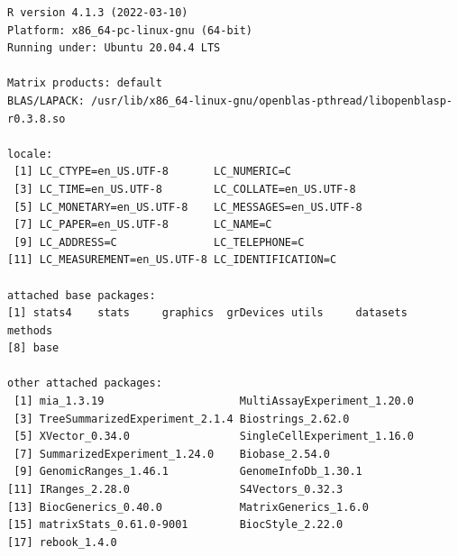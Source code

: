 \documentclass[
]{book}
\begin{document}
\begin{verbatim}
R version 4.1.3 (2022-03-10)
Platform: x86_64-pc-linux-gnu (64-bit)
Running under: Ubuntu 20.04.4 LTS

Matrix products: default
BLAS/LAPACK: /usr/lib/x86_64-linux-gnu/openblas-pthread/libopenblasp-r0.3.8.so

locale:
 [1] LC_CTYPE=en_US.UTF-8       LC_NUMERIC=C              
 [3] LC_TIME=en_US.UTF-8        LC_COLLATE=en_US.UTF-8    
 [5] LC_MONETARY=en_US.UTF-8    LC_MESSAGES=en_US.UTF-8   
 [7] LC_PAPER=en_US.UTF-8       LC_NAME=C                 
 [9] LC_ADDRESS=C               LC_TELEPHONE=C            
[11] LC_MEASUREMENT=en_US.UTF-8 LC_IDENTIFICATION=C       

attached base packages:
[1] stats4    stats     graphics  grDevices utils     datasets  methods  
[8] base     

other attached packages:
 [1] mia_1.3.19                     MultiAssayExperiment_1.20.0   
 [3] TreeSummarizedExperiment_2.1.4 Biostrings_2.62.0             
 [5] XVector_0.34.0                 SingleCellExperiment_1.16.0   
 [7] SummarizedExperiment_1.24.0    Biobase_2.54.0                
 [9] GenomicRanges_1.46.1           GenomeInfoDb_1.30.1           
[11] IRanges_2.28.0                 S4Vectors_0.32.3              
[13] BiocGenerics_0.40.0            MatrixGenerics_1.6.0          
[15] matrixStats_0.61.0-9001        BiocStyle_2.22.0              
[17] rebook_1.4.0                  


\end{verbatim}
\end{document}
